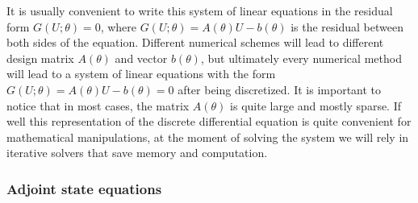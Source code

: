 It is usually convenient to write this system of linear equations in the residual form $G(U; \theta) = 0$, where $G(U; \theta) = A(\theta) U - b(\theta)$ is the residual between both sides of the equation. 
Different numerical schemes will lead to different design matrix $A(\theta)$ and vector $b(\theta)$, but ultimately every numerical method will lead to a system of linear equations with the form $G(U; \theta) = A(\theta) U - b(\theta) = 0$ after being discretized. 
It is important to notice that in most cases, the matrix $A(\theta)$ is quite large and mostly sparse. 
If well this representation of the discrete differential equation is quite convenient for mathematical manipulations, at the moment of solving the system we will rely in iterative solvers that save memory and computation. 

\subsubsection{Adjoint state equations}

